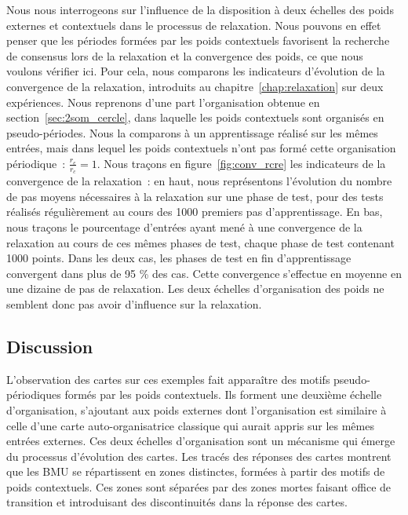 \documentclass[../main]{subfiles}
\begin{document}
Nous nous interrogeons sur l'influence de la disposition à deux échelles des poids externes et contextuels dans le processus de relaxation.
Nous pouvons en effet penser que les périodes formées par les poids contextuels favorisent la recherche de consensus lors de la relaxation et la convergence des poids, ce que nous voulons vérifier ici.
Pour cela, nous comparons les indicateurs d'évolution de la convergence de la relaxation, introduits au chapitre~\ref{chap:relaxation} sur deux expériences.
Nous reprenons d'une part l'organisation obtenue en section~\ref{sec:2som_cercle}, dans laquelle les poids contextuels sont organisés en pseudo-périodes. Nous la comparons à un apprentissage réalisé sur les mêmes entrées, mais dans lequel les poids contextuels n'ont pas formé cette organisation périodique~: $\frac{r_e}{r_c} = 1$. 
Nous traçons en figure~\ref{fig:conv_rcre} les indicateurs de la convergence de la relaxation~: en haut, nous représentons l'évolution du nombre de pas moyens nécessaires à la relaxation sur une phase de test, pour des tests réalisés régulièrement au cours des 1000 premiers pas d'apprentissage.
En bas, nous traçons le pourcentage d'entrées ayant mené à une convergence de la relaxation au cours de ces mêmes phases de test, chaque phase de test contenant 1000 points.
Dans les deux cas, les phases de test en fin d'apprentissage convergent dans plus de 95 \% des cas. Cette convergence s'effectue en moyenne en une dizaine de pas de relaxation. Les deux échelles d'organisation des poids ne semblent donc pas  avoir d'influence sur la relaxation.

\subsection{Discussion}

L'observation des cartes sur ces exemples fait apparaître des motifs pseudo-périodiques formés par les poids contextuels. Ils forment une deuxième échelle d'organisation, s'ajoutant aux poids externes dont l'organisation est similaire à celle d'une carte auto-organisatrice classique qui aurait appris sur les mêmes entrées externes.
Ces deux échelles d'organisation sont un mécanisme qui émerge du processus d'évolution des cartes.
Les tracés des réponses des cartes montrent que les BMU se répartissent en zones distinctes, formées à partir des motifs de poids contextuels. Ces zones sont séparées par des zones mortes faisant office de transition et introduisant des discontinuités dans la réponse des cartes.
\end{document}
